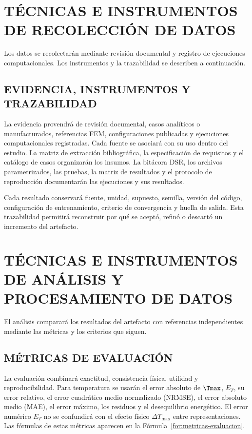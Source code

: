 \section{TÉCNICAS E INSTRUMENTOS DE RECOLECCIÓN DE DATOS}

Los datos se recolectarán mediante revisión documental y registro de ejecuciones computacionales. Los instrumentos y la trazabilidad se describen a continuación.

\subsection{EVIDENCIA, INSTRUMENTOS Y TRAZABILIDAD}

La evidencia provendrá de revisión documental, casos analíticos o manufacturados, referencias FEM, configuraciones publicadas y ejecuciones computacionales registradas. Cada fuente se asociará con su uso dentro del estudio. La matriz de extracción bibliográfica, la especificación de requisitos y el catálogo de casos organizarán los insumos. La bitácora DSR, los archivos parametrizados, las pruebas, la matriz de resultados y el protocolo de reproducción documentarán las ejecuciones y sus resultados.

Cada resultado conservará fuente, unidad, supuesto, semilla, versión del código, configuración de entrenamiento, criterio de convergencia y huella de salida. Esta trazabilidad permitirá reconstruir por qué se aceptó, refinó o descartó un incremento del artefacto.

\section{TÉCNICAS E INSTRUMENTOS DE ANÁLISIS Y PROCESAMIENTO DE DATOS}

El análisis comparará los resultados del artefacto con referencias independientes mediante las métricas y los criterios que siguen.

\subsection{MÉTRICAS DE EVALUACIÓN}

La evaluación combinará exactitud, consistencia física, utilidad y reproducibilidad. Para temperatura se usarán el error absoluto de $\Tmax$, $E_T$, su error relativo, el error cuadrático medio normalizado (NRMSE), el error absoluto medio (MAE), el error máximo, los residuos y el desequilibrio energético. El error numérico $E_T$ no se confundirá con el efecto físico $\Delta T_{\max}$ entre representaciones. Las fórmulas de estas métricas aparecen en la Fórmula~\ref{for:metricas-evaluacion}.

